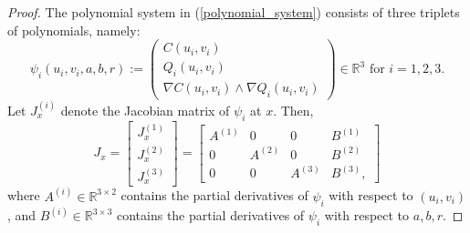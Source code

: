 \documentclass[12pt]{amsart}
\theoremstyle{definition}
\theoremstyle{definition}
\numberwithin{equation}{section}
\begin{document}
\begin{proof}
The polynomial system in (\ref{polynomial_system}) consists of three triplets of polynomials, namely:
$$\psi_i(u_i,v_i,a,b,r):=\begin{pmatrix}
C(u_i,v_i)\\
Q_i(u_i,v_i)\\
\nabla C(u_i,v_i) \wedge
\nabla Q_i(u_i,v_i)
\end{pmatrix}\in\mathbb R^3 \text{ for } i = 1,2,3.
$$
Let $J_x^{(i)}$ denote the Jacobian matrix of $\psi_i$ at $x$. Then,
\begin{equation}\label{J_x_eq}
J_x = \begin{bmatrix} J_x^{(1)} \\ J_x^{(2)} \\ J_x^{(3)}\end{bmatrix} = \begin{bmatrix} A^{(1)} & 0 & 0 & B^{(1)} \\ 
    0 & A^{(2)} &  0 & B^{(2)} \\
    0 & 0 & A^{(3)} &  B^{(3)},
\end{bmatrix}
\end{equation}
where $A^{(i)}\in\mathbb R^{3\times 2}$ contains the partial derivatives of $\psi_i$ with respect to $(u_i,v_i)$, and $B^{(i)}\in\mathbb R^{3\times 3}$ contains the partial derivatives of $\psi_i$ with respect to $a,b,r$.


\end{proof}
\end{document}

